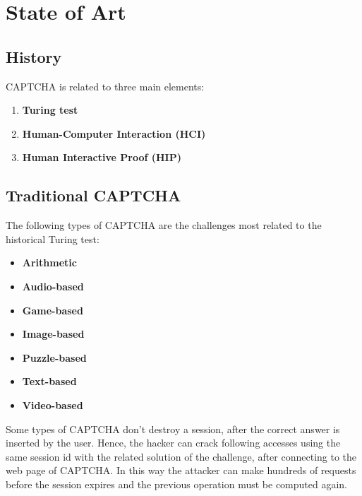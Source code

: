 \chapter{State of Art}
\section{History}
CAPTCHA is related to three main elements\cite{types_CAPTCHA}:
\begin{enumerate}
\item{\textbf{Turing test}\\

}
\item{\textbf{Human-Computer Interaction (HCI)}\\

}
\item{\textbf{Human Interactive Proof (HIP)}\\

}
\end{enumerate}

\section{Traditional CAPTCHA}
The following types of CAPTCHA are the challenges most related to the historical Turing test: 
\begin{itemize}
\item{\textbf{Arithmetic}\\
}
\item{\textbf{Audio-based}\\
}
\item{\textbf{Game-based}\\
}
\item{\textbf{Image-based}\\
}
\item{\textbf{Puzzle-based}\\
}
\item{\textbf{Text-based}\\
}
\item{\textbf{Video-based}\\
}
\end{itemize}
Some types of CAPTCHA don't destroy a session, after the correct answer is inserted by the user\cite{text_audio}. Hence, the hacker can crack following accesses using the same session id with the related solution of the challenge, after connecting to the web page of CAPTCHA. In this way the attacker can make hundreds of requests before the session expires and the previous operation must be computed again.


